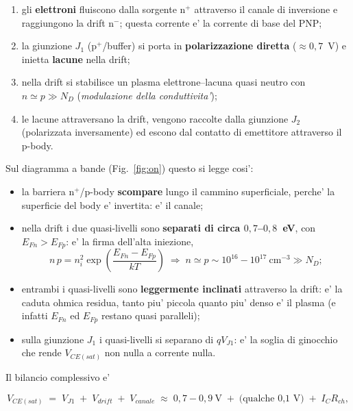 \documentclass[11pt,a4paper]{article}
\begin{document}
\begin{enumerate}[nosep,leftmargin=1.6em]
  \item gli \textbf{elettroni} fluiscono dalla sorgente $\mathrm{n^{+}}$
        attraverso il canale di inversione e raggiungono la drift
        $\mathrm{n^{-}}$; questa corrente e' la corrente di base del PNP;
  \item la giunzione $J_1$ ($\mathrm{p^{+}}$/buffer) si porta in
        \textbf{polarizzazione diretta} ($\approx 0{,}7$~V) e inietta
        \textbf{lacune} nella drift;
  \item nella drift si stabilisce un plasma elettrone--lacuna quasi neutro con
        $n \simeq p \gg N_D$ (\emph{modulazione della conduttivita'});
  \item le lacune attraversano la drift, vengono raccolte dalla giunzione $J_2$
        (polarizzata inversamente) ed escono dal contatto di emettitore
        attraverso il p-body.
\end{enumerate}

Sul diagramma a bande (Fig.~\ref{fig:on}) questo si legge cosi':

\begin{itemize}[nosep,leftmargin=1.4em]
  \item la barriera $\mathrm{n^{+}}$/p-body \textbf{scompare} lungo il cammino
        superficiale, perche' la superficie del body e' invertita: e' il canale;
  \item nella drift i due quasi-livelli sono \textbf{separati di circa
        $0{,}7$--$0{,}8$~eV}, con $E_{Fn}>E_{Fp}$: e' la firma dell'alta
        iniezione,
        \begin{equation}
        n\,p = n_i^2 \exp\!\left(\frac{E_{Fn}-E_{Fp}}{kT}\right)
        \;\Rightarrow\;
        n \simeq p \sim 10^{16}\!-\!10^{17}~\mathrm{cm^{-3}} \gg N_D;
        \end{equation}
  \item entrambi i quasi-livelli sono \textbf{leggermente inclinati} attraverso
        la drift: e' la caduta ohmica residua, tanto piu' piccola quanto piu'
        denso e' il plasma (e infatti $E_{Fn}$ ed $E_{Fp}$ restano quasi
        paralleli);
  \item sulla giunzione $J_1$ i quasi-livelli si separano di $qV_{J1}$: e' la
        soglia di ginocchio che rende $V_{CE(sat)}$ non nulla a corrente nulla.
\end{itemize}

Il bilancio complessivo e'

\begin{equation}
V_{CE(sat)} \;=\; V_{J1}\;+\;V_{drift}\;+\;V_{canale}
\;\approx\; 0{,}7\!-\!0{,}9~\mathrm{V} \;+\; \text{(qualche 0,1~V)} \;+\; I_C R_{ch},
\end{equation}
\end{document}
